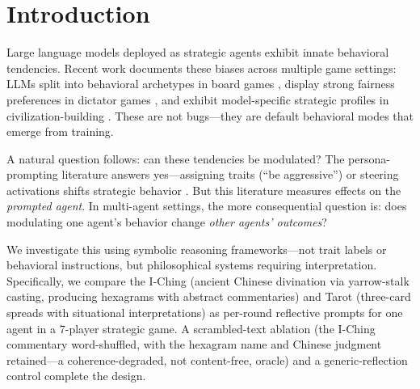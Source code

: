 \documentclass[11pt]{article}
\begin{document}
\begin{abstract}
map corridor; a depth-matched follow-up then shows that expansion is governed by campaign memory depth, not the oracle (condition $p = 0.55$), so even this pathway is emergent rather than framework-specific. We present this as an observation paper establishing that alignment-framework choice at the agent level produces distinctive, non-additive system-level consequences in multi-agent settings, transmitted through emergent multi-agent and memory dynamics rather than the framework's per-decision effect on the receiving agent.
\end{abstract}

\section{Introduction}
\label{sec:intro}

Large language models deployed as strategic agents exhibit innate behavioral tendencies. Recent work documents these biases across multiple game settings: LLMs split into behavioral archetypes in board games \citep{Jain2026ludobench}, display strong fairness preferences in dictator games \citep{Einwiller2025dictator}, and exhibit model-specific strategic profiles in civilization-building \citep{Chen2026civbench}. These are not bugs---they are default behavioral modes that emerge from training.

A natural question follows: can these tendencies be modulated? The persona-prompting literature answers yes---assigning traits (``be aggressive'') or steering activations shifts strategic behavior \citep{Licato2025persona, Sun2026persona}. But this literature measures effects on the \emph{prompted agent}. In multi-agent settings, the more consequential question is: does modulating one agent's behavior change \emph{other agents' outcomes}?

We investigate this using symbolic reasoning frameworks---not trait labels or behavioral instructions, but philosophical systems requiring interpretation. Specifically, we compare the I-Ching (ancient Chinese divination via yarrow-stalk casting, producing hexagrams with abstract commentaries) and Tarot (three-card spreads with situational interpretations) as per-round reflective prompts for one agent in a 7-player strategic game. A scrambled-text ablation (the I-Ching commentary word-shuffled, with the hexagram name and Chinese judgment retained---a coherence-degraded, not content-free, oracle) and a generic-reflection control complete the design.
\end{document}
